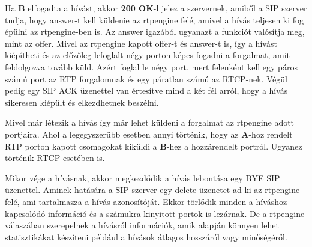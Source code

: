 Ha \textbf{B} elfogadta a hívást, akkor \textbf{200 OK}-l jelez a szervernek, amiből a
SIP szerver tudja, hogy answer-t kell küldenie az rtpengine felé, amivel a hívás teljesen
ki fog épülni az rtpengine-ben is. Az answer igazából ugyanazt a funkciót valósítja meg,
mint az offer. Mivel az rtpengine kapott offer-t és answer-t is, így a hívást kiépítheti
és az előzőleg lefoglalt négy porton képes fogadni a forgalmat, amit feldolgozva 
tovább küld. Azért foglal le négy port, mert felenként kell egy páros számú port az 
RTP forgalomnak és egy páratlan számú az RTCP-nek. Végül pedig egy SIP ACK üzenettel van
értesítve mind a két fél arról, hogy a hívás sikeresen kiépült és elkezdhetnek 
beszélni. 

Mivel már létezik a hívás így már lehet küldeni a forgalmat az rtpengine adott 
portjaira. Ahol a legegyszerűbb esetben annyi történik, hogy az \textbf{A}-hoz rendelt
RTP porton kapott csomagokat kiküldi a \textbf{B}-hez a hozzárendelt portról. Ugyanez
történik RTCP esetében is. 

Mikor vége a hívásnak, akkor megkezdődik a hívás lebontása egy BYE SIP üzenettel. Aminek
hatására a SIP szerver egy delete üzenetet ad ki az rtpengine felé, ami tartalmazza a hívás
azonosítóját. Ekkor törlődik minden a híváshoz kapcsolódó információ és a számukra kinyitott
portok is lezárnak. De a rtpengine válaszában szerepelnek a hívásról információk, amik alapján
könnyen lehet statisztikákat készíteni például a hívások átlagos hosszáról vagy minőségéről.